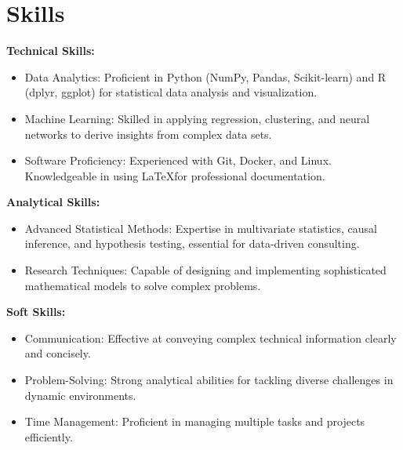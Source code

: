 \section{Skills}
\textbf{Technical Skills:}
\begin{itemize}[leftmargin=*]
    \item Data Analytics: Proficient in Python (NumPy, Pandas, Scikit-learn) and R (dplyr, ggplot) for statistical data analysis and visualization.
    \item Machine Learning: Skilled in applying regression, clustering, and neural networks to derive insights from complex data sets.
    \item Software Proficiency: Experienced with Git, Docker, and Linux. Knowledgeable in using \LaTeX for professional documentation.
\end{itemize}
\textbf{Analytical Skills:}
\begin{itemize}[leftmargin=*]
    \item Advanced Statistical Methods: Expertise in multivariate statistics, causal inference, and hypothesis testing, essential for data-driven consulting.
    \item Research Techniques: Capable of designing and implementing sophisticated mathematical models to solve complex problems.
\end{itemize}
\textbf{Soft Skills:}
\begin{itemize}[leftmargin=*]
    \item Communication: Effective at conveying complex technical information clearly and concisely.
    \item Problem-Solving: Strong analytical abilities for tackling diverse challenges in dynamic environments.
    \item Time Management: Proficient in managing multiple tasks and projects efficiently.
\end{itemize}

